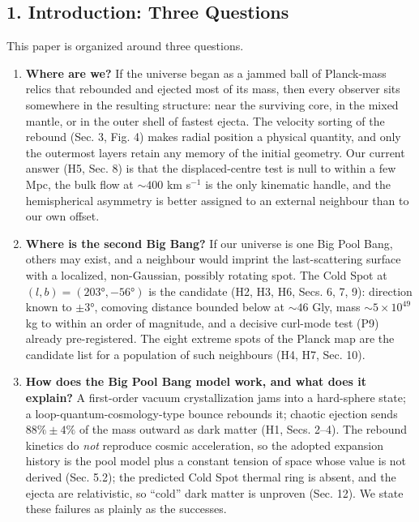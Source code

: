 \documentclass[
]{article}
\begin{document}
\hypertarget{introduction-three-questions}{%
\subsection{\texorpdfstring{\textbf{1. Introduction: Three
Questions}}{1. Introduction: Three Questions}}\label{introduction-three-questions}}

This paper is organized around three questions.

\begin{enumerate}
\def\labelenumi{\arabic{enumi}.}
\item
  \textbf{Where are we?} If the universe began as a jammed ball of
  Planck-mass relics that rebounded and ejected most of its mass, then
  every observer sits somewhere in the resulting structure: near the
  surviving core, in the mixed mantle, or in the outer shell of fastest
  ejecta. The velocity sorting of the rebound (Sec. 3, Fig. 4) makes
  radial position a physical quantity, and only the outermost layers
  retain any memory of the initial geometry. Our current answer (H5,
  Sec. 8) is that the displaced-centre test is null to within a few Mpc,
  the bulk flow at \(\sim\!400\) km s\(^{-1}\) is the only kinematic
  handle, and the hemispherical asymmetry is better assigned to an
  external neighbour than to our own offset.
\item
  \textbf{Where is the second Big Bang?} If our universe is one Big Pool
  Bang, others may exist, and a neighbour would imprint the
  last-scattering surface with a localized, non-Gaussian, possibly
  rotating spot. The Cold Spot at \((l,b) = (203°, -56°)\) is the
  candidate (H2, H3, H6, Secs. 6, 7, 9): direction known to \(\pm 3°\),
  comoving distance bounded below at \(\sim\!46\) Gly, mass
  \(\sim\!5\times10^{49}\) kg to within an order of magnitude, and a
  decisive curl-mode test (P9) already pre-registered. The eight extreme
  spots of the Planck map are the candidate list for a population of
  such neighbours (H4, H7, Sec. 10).
\item
  \textbf{How does the Big Pool Bang model work, and what does it
  explain?} A first-order vacuum crystallization jams into a hard-sphere
  state; a loop-quantum-cosmology-type bounce rebounds it; chaotic
  ejection sends \(88\% \pm 4\%\) of the mass outward as dark matter
  (H1, Secs. 2--4). The rebound kinetics do \emph{not} reproduce cosmic
  acceleration, so the adopted expansion history is the pool model plus
  a constant tension of space whose value is not derived (Sec. 5.2); the
  predicted Cold Spot thermal ring is absent, and the ejecta are
  relativistic, so ``cold'' dark matter is unproven (Sec. 12). We state
  these failures as plainly as the successes.
\end{enumerate}
\end{document}
